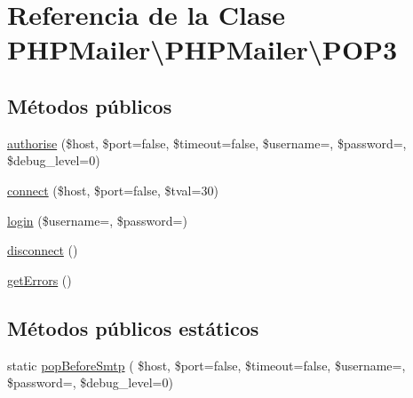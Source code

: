 \hypertarget{classPHPMailer_1_1PHPMailer_1_1POP3}{}\section{Referencia de la Clase P\+H\+P\+Mailer\textbackslash{}P\+H\+P\+Mailer\textbackslash{}P\+O\+P3}
\label{classPHPMailer_1_1PHPMailer_1_1POP3}
\subsection*{Métodos públicos}
\begin{DoxyCompactItemize}
\item 
\hyperlink{classPHPMailer_1_1PHPMailer_1_1POP3_a1a5462a218993658c91b6df0c39e641e}{authorise} (\$host, \$port=false, \$timeout=false, \$username=\textquotesingle{}\textquotesingle{}, \$password=\textquotesingle{}\textquotesingle{}, \$debug\+\_\+level=0)
\item 
\hyperlink{classPHPMailer_1_1PHPMailer_1_1POP3_af5a0b40fc1b99e775ab620c6fc7f7184}{connect} (\$host, \$port=false, \$tval=30)
\item 
\hyperlink{classPHPMailer_1_1PHPMailer_1_1POP3_a515c66a5062e6616fc984ee4ac007fb3}{login} (\$username=\textquotesingle{}\textquotesingle{}, \$password=\textquotesingle{}\textquotesingle{})
\item 
\hyperlink{classPHPMailer_1_1PHPMailer_1_1POP3_a8696c83c33d33a5122b6482abc138c09}{disconnect} ()
\item 
\hyperlink{classPHPMailer_1_1PHPMailer_1_1POP3_a2a5174e828edb59523c92dbf7eae244b}{get\+Errors} ()
\end{DoxyCompactItemize}
\subsection*{Métodos públicos estáticos}
\begin{DoxyCompactItemize}
\item 
static \hyperlink{classPHPMailer_1_1PHPMailer_1_1POP3_a19640d96aebdde899ccd721ab1299392}{pop\+Before\+Smtp} ( \$host, \$port=false, \$timeout=false, \$username=\textquotesingle{}\textquotesingle{}, \$password=\textquotesingle{}\textquotesingle{}, \$debug\+\_\+level=0)
\end{DoxyCompactItemize}
